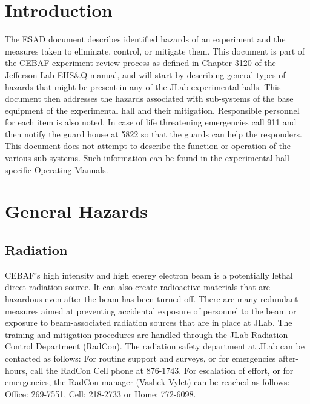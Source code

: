 
%
%

\chapter{Introduction}

The ESAD document describes identified hazards of an experiment and the measures taken to eliminate, control, or mitigate them.
This document is part of the CEBAF experiment review process as defined in
\href{http://www.jlab.org/ehs/ehsmanual/manual/3120.html}{Chapter 3120 of the Jefferson Lab EHS\&Q manual},
and will start by describing general types of hazards that might be present in any of the  
JLab experimental halls.  This document then addresses the hazards associated 
with sub-systems of the base equipment of the experimental hall and their 
mitigation.  Responsible personnel for each item is also noted.  
In case of life threatening 
emergencies call 911 and then notify the guard house at 5822 so that the guards can help
the responders.  This document does not attempt to describe the function 
or operation of the various sub-systems. Such information can be found in
the experimental hall specific Operating Manuals.


\chapter{General Hazards}

\section{Radiation}
	
CEBAF's high intensity and high energy electron beam is a potentially lethal direct radiation source. 
It can also create radioactive materials that are hazardous even  after the beam has been turned off. 
There are many redundant measures aimed at preventing accidental exposure of personnel to the beam 
or exposure to beam-associated radiation sources that are in place at JLab. The training and mitigation 
procedures are handled through the JLab Radiation Control Department (RadCon). The radiation safety 
department at JLab can be contacted as follows: For routine support and surveys, or for emergencies 
after-hours, call the RadCon Cell phone at 876-1743. For escalation of effort, or for emergencies, 
the RadCon manager (Vashek Vylet) can be reached as follows: Office: 269-7551, Cell: 218-2733 or Home: 772-6098.

